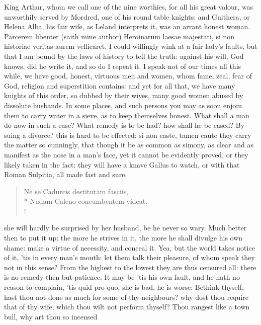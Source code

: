 King Arthur, whom we call one of the nine worthies, for all his
great valour, was unworthily served by Mordred, one of his round table
knights: and Guithera, or Helena Alba, his fair wife, as Leland
interprets it, was an arrant honest woman. Parcerem libenter (saith
mine author) Heroinarum laesae majestati, si non historiae
veritas aurem vellicaret, I could willingly wink at a fair lady's
faults, but that I am bound by the laws of history to tell the truth:
against his will, God knows, did he write it, and so do I repeat it. I
speak not of our times all this while, we have good, honest, virtuous
men and women, whom fame, zeal, fear of God, religion and superstition
contains: and yet for all that, we have many knights of this order, so
dubbed by their wives, many good women abused by dissolute husbands. In
some places, and such persons you may as soon enjoin them to carry
water in a sieve, as to keep themselves honest. What shall a man do now
in such a case? What remedy is to be had? how shall he be eased? By
suing a divorce? this is hard to be effected: si non caste, tamen caute
they carry the matter so cunningly, that though it be as common as
simony, as clear and as manifest as the nose in a man's face, yet it
cannot be evidently proved, or they likely taken in the fact: they will
have a knave Gallus to watch, or with that Roman Sulpitia, all
made fast and sure,
%
\begin{latin}%
\begin{verse}%
Ne se Cadurcis destitutam fasciis,\\*
Nudam Caleno concumbentem videat.\\!
\end{verse}%
\end{latin}%
%
she will hardly be surprised by her husband, be he never so wary. Much
better then to put it up: the more he strives in it, the more he shall
divulge his own shame: make a virtue of necessity, and conceal it. Yea,
but the world takes notice of it, 'tis in every man's mouth: let them
talk their pleasure, of whom speak they not in this sense? From the
highest to the lowest they are thus censured all: there is no remedy
then but patience. It may be 'tis his own fault, and he hath no reason
to complain, 'tis quid pro quo, she is bad, he is worse: Bethink
thyself, hast thou not done as much for some of thy neighbours? why
dost thou require that of thy wife, which thou wilt not perform
thyself? Thou rangest like a town bull, why art thou so incensed
